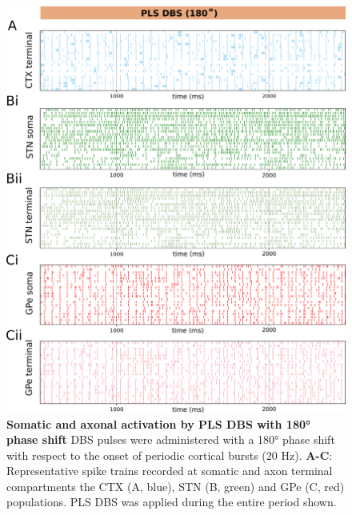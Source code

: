%
%
%
%
%

\begin{figure}
\centering
\includegraphics[width=\textwidth]{ch_appendix/figs/fig_pls_ang-180_rastergrams.png}
\caption{
\textbf{Somatic and axonal activation by PLS DBS with \ang{180} phase shift}
DBS pulses were administered with a \ang{180} phase shift with respect to the onset of periodic cortical bursts (20 Hz).
\textbf{A-C}: Representative spike trains recorded at somatic and axon terminal compartments the CTX (A, blue), STN (B, green) and GPe (C, red) populations. PLS DBS was applied during the entire period shown.
}
\label{fig:pls_ang-180_rastergrams}
\end{figure}

